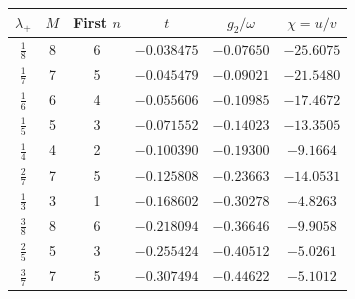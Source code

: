 \begin{tabular}{cccccc}\toprule
$\lambda_+$ & $M$ & First $n$ & $t$ & $g_2/\omega$ & $\chi=u/v$\\\midrule
$\tfrac{1}{8}$ & 8 & 6 & $-0.038475$ & $-0.07650$ & $-25.6075$\\
$\tfrac{1}{7}$ & 7 & 5 & $-0.045479$ & $-0.09021$ & $-21.5480$\\
$\tfrac{1}{6}$ & 6 & 4 & $-0.055606$ & $-0.10985$ & $-17.4672$\\
$\tfrac{1}{5}$ & 5 & 3 & $-0.071552$ & $-0.14023$ & $-13.3505$\\
$\tfrac{1}{4}$ & 4 & 2 & $-0.100390$ & $-0.19300$ & $-9.1664$\\
$\tfrac{2}{7}$ & 7 & 5 & $-0.125808$ & $-0.23663$ & $-14.0531$\\
$\tfrac{1}{3}$ & 3 & 1 & $-0.168602$ & $-0.30278$ & $-4.8263$\\
$\tfrac{3}{8}$ & 8 & 6 & $-0.218094$ & $-0.36646$ & $-9.9058$\\
$\tfrac{2}{5}$ & 5 & 3 & $-0.255424$ & $-0.40512$ & $-5.0261$\\
$\tfrac{3}{7}$ & 7 & 5 & $-0.307494$ & $-0.44622$ & $-5.1012$\\
\bottomrule\end{tabular}
